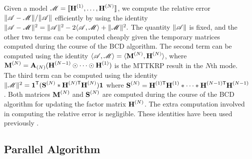 Given a model $\T{M}=\CP$, we compute the relative error $\|\TA - \T{M}\|/\|\TA\|$ efficiently by using the identity $\|\TA-\T{M}\|^2 = \|\TA\|^2 - 2\langle \TA, \T{M} \rangle + \|\T{M}\|^2.$
The quantity $\|\TA\|$ is fixed, and the other two terms can be computed cheaply given the temporary matrices computed during the course of the BCD algorithm.
The second term can be computed using the identity $\langle \TA, \T{M} \rangle = \langle \Mn{M}{N}, \Mn{H}{N} \rangle$, where $\Mn{M}{N} = \Mz{A}{N} (\Mn{H}{N-1} \Khat \cdots \Khat \Mn{H}{1})$ is the MTTKRP result in the $N$th mode.
The third term can be computed using the identity $\|\T{M}\|^2 = \V{1}^\Tra(\Mn{S}{N} \Hada \MnTra{H}{N} \Mn{H}{N})\V{1}$ where $\Mn{S}{N}=\MnTra{H}{1} \Mn{H}{1} \Hada \cdots \Hada \MnTra{H}{N-1} \Mn{H}{N-1}$.
Both matrices $\Mn{M}{N}$ and $\Mn{S}{N}$ are computed during the course of the BCD algorithm for updating the factor matrix $\Mn{H}{N}$.
The extra computation involved in computing the relative error is negligible.
These identities have been used previously \cite{KB2009,TensorBox,SK16,LKLHS2017}.

\subsection{Parallel Algorithm}

